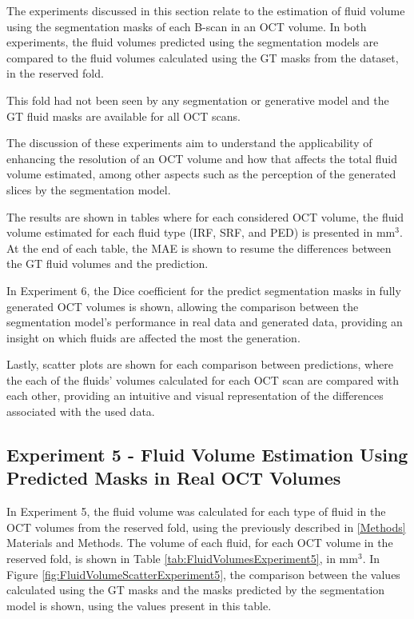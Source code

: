 The experiments discussed in this section relate to the estimation of fluid volume using the segmentation masks of each B-scan in an OCT volume. In both experiments, the fluid volumes predicted using the segmentation models are compared to the fluid volumes calculated using the GT masks from the dataset, in the reserved fold. 
\par
This fold had not been seen by any segmentation or generative model and the GT fluid masks are available for all OCT scans.
\par
The discussion of these experiments aim to understand the applicability of enhancing the resolution of an OCT volume and how that affects the total fluid volume estimated, among other aspects such as the perception of the generated slices by the segmentation model.
\par
The results are shown in tables where for each considered OCT volume, the fluid volume estimated for each fluid type (IRF, SRF, and PED) is presented in mm$^{3}$. At the end of each table, the MAE is shown to resume the differences between the GT fluid volumes and the prediction.
\par
In Experiment 6, the Dice coefficient for the predict segmentation masks in fully generated OCT volumes is shown, allowing the comparison between the segmentation model's performance in real data and generated data, providing an insight on which fluids are affected the most the generation.
\par
Lastly, scatter plots are shown for each comparison between predictions, where the each of the fluids' volumes calculated for each OCT scan are compared with each other, providing an intuitive and visual representation of the differences associated with the used data.

\subsection{Experiment 5 - Fluid Volume Estimation Using Predicted Masks in Real OCT Volumes}
In Experiment 5, the fluid volume was calculated for each type of fluid in the OCT volumes from the reserved fold, using the previously described in \ref{Methods} Materials and Methods. The volume of each fluid, for each OCT volume in the reserved fold, is shown in Table \ref{tab:FluidVolumesExperiment5}, in mm$^{3}$. In Figure \ref{fig:FluidVolumeScatterExperiment5}, the comparison between the values calculated using the GT masks and the masks predicted by the segmentation model is shown, using the values present in this table.

